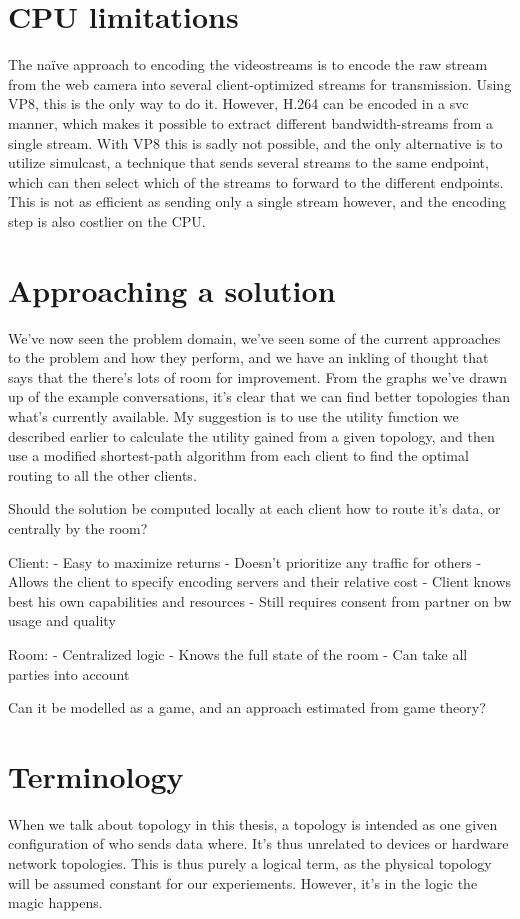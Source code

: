 \section{CPU limitations}

The naïve approach to encoding the videostreams is to encode the raw stream from the web camera into several client-optimized streams for transmission. Using VP8, this is the only way to do it. However, H.264 can be encoded in a \gls{svc} manner, which makes it possible to extract different bandwidth-streams from a single stream. With VP8 this is sadly not possible, and the only alternative is to utilize \gls{simulcast}, a technique that sends several streams to the same endpoint, which can then select which of the streams to forward to the different endpoints. This is not as efficient as sending only a single stream however, and the encoding step is also costlier on the CPU.


\section{Approaching a solution}

We've now seen the problem domain, we've seen some of the current approaches to the problem and how they perform, and we have an inkling of thought that says that the there's lots of room for improvement. From the graphs we've drawn up of the example conversations, it's clear that we can find better topologies than what's currently available. My suggestion is to use the utility function we described earlier to calculate the utility gained from a given topology, and then use a modified shortest-path algorithm from each client to find the optimal routing to all the other clients.

Should the solution be computed locally at each client how to route it's data, or centrally by the room?

    Client:
        - Easy to maximize returns
        - Doesn't prioritize any traffic for others
        - Allows the client to specify encoding servers and their relative cost
        - Client knows best his own capabilities and resources
        - Still requires consent from partner on bw usage and quality

    Room:
        - Centralized logic
        - Knows the full state of the room
        - Can take all parties into account

Can it be modelled as a game, and an approach estimated from game theory?

\section{Terminology}

When we talk about topology in this thesis, a topology is intended as one given configuration of who sends data where. It's thus unrelated to devices or hardware network topologies.  This is thus purely a logical term, as the physical topology will be assumed constant for our experiements. However, it's in the logic the magic happens.
